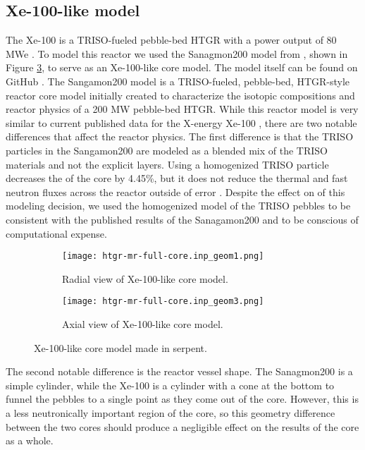 \subsection{Xe-100-like model} \label{sec:xe100_serpent_model}
The Xe-100 is a \acrfull{TRISO}-fueled pebble-bed \gls{HTGR} with a power 
output of 80 MWe \cite{mulder_overview_2021}. To model this reactor
we used the Sanagmon200 model from \cite{richter_isotopic_2022}, shown in 
Figure \ref{fig:xe100_core}, to serve as an Xe-100-like 
core model. The model itself can be found on GitHub \cite{richter_zoerichterphlox_2022}.
The Sangamon200 model is a \acrfull{TRISO}-fueled, pebble-bed, \gls{HTGR}-style 
reactor core model 
initially created to characterize the isotopic compositions and 
reactor physics of a 200 MW pebble-bed \gls{HTGR}. While this reactor model 
is very similar to current published data for the X-energy Xe-100
\cite{mulder_overview_2021}, there are two notable differences that affect 
the reactor physics. The first difference is that the \gls{TRISO} particles 
in the Sangamon200 are modeled as a blended mix of the \gls{TRISO} 
materials and not the explicit layers. Using a homogenized \gls{TRISO} particle 
decreases the \keff of the core by 4.45\%, but it does not reduce the 
thermal and fast neutron fluxes across the reactor outside of error 
\cite{richter_isotopic_2022}. Despite 
the effect on \keff of this modeling decision, we used the 
homogenized model of the \gls{TRISO} pebbles to be consistent with the 
published results of the Sanagamon200 \cite{richter_isotopic_2022} and 
to be conscious of computational expense. 

\begin{figure}[ht]
    \centering 
    \begin{subfigure}{0.45\textwidth}
        \centering 
        \texttt{[image: htgr-mr-full-core.inp\_geom1.png]}
        \caption{Radial view of Xe-100-like core model.}
        \label{fig:xe100_core_radial}        
    \end{subfigure}
    \hfill
    \begin{subfigure}{0.45\textwidth}
        \centering 
        \texttt{[image: htgr-mr-full-core.inp\_geom3.png]}
        \caption{Axial view of Xe-100-like core model.}
        \label{fig:xe100_core_axial}        
    \end{subfigure}
    \caption{Xe-100-like core model made in serpent.}
    \label{fig:xe100_core}
\end{figure}

The second 
notable difference is the reactor vessel shape. The Sanagmon200 is a simple 
cylinder, while the Xe-100 is a cylinder with a cone at the bottom to funnel 
the pebbles to a single point as they come out of the core. However, 
this is a less neutronically important region of the core, so this geometry 
difference between the two cores should produce a negligible effect on the 
results of the core as a whole.

